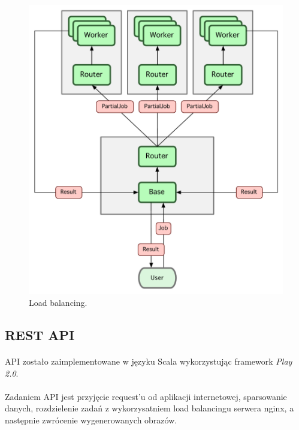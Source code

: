 \documentclass[wide,a4paper,titlepage,12pt]{article}
\begin{document}
\begin{figure}[h!]
\begin{center}
\includegraphics[scale=0.5]{schema.pdf}
\end{center}
\caption{Load balancing.}
\label{fig:loadbalancing}
\end{figure}

\subsection{REST API}
\paragraph{}
API zostało zaimplementowane w języku Scala wykorzystując framework \textit{Play 2.0}.

\paragraph{}
Zadaniem API jest przyjęcie request'u od aplikacji internetowej, sparsowanie danych, rozdzielenie zadań
z wykorzysatniem load balancingu serwera nginx, a następnie zwrócenie wygenerowanych obrazów.
\end{document}
